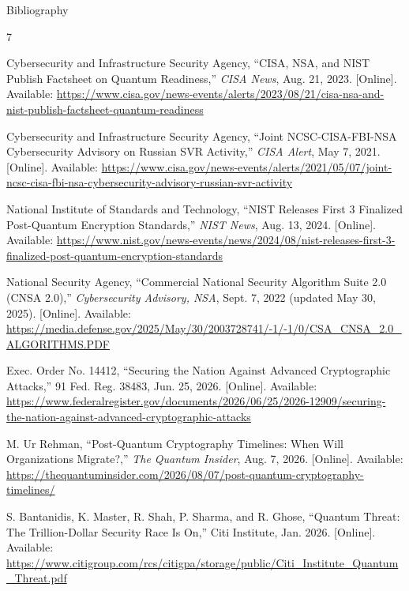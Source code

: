 \documentclass{article}
\begin{document}
\clearpage
{}
{}
 {Bibliography}
\begin{thebibliography}{7}

Cybersecurity and Infrastructure Security Agency, ``CISA, NSA, and NIST Publish Factsheet on Quantum Readiness,'' \textit{CISA News}, Aug. 21, 2023. [Online]. Available: \url{https://www.cisa.gov/news-events/alerts/2023/08/21/cisa-nsa-and-nist-publish-factsheet-quantum-readiness}

Cybersecurity and Infrastructure Security Agency, ``Joint NCSC-CISA-FBI-NSA Cybersecurity Advisory on Russian SVR Activity,'' \textit{CISA Alert}, May 7, 2021. [Online]. Available: \url{https://www.cisa.gov/news-events/alerts/2021/05/07/joint-ncsc-cisa-fbi-nsa-cybersecurity-advisory-russian-svr-activity}

National Institute of Standards and Technology, ``NIST Releases First 3 Finalized Post-Quantum Encryption Standards,'' \textit{ NIST News}, Aug. 13, 2024. [Online]. Available: \url{https://www.nist.gov/news-events/news/2024/08/nist-releases-first-3-finalized-post-quantum-encryption-standards}

National Security Agency, ``Commercial National Security Algorithm Suite 2.0 (CNSA 2.0),'' \textit{ Cybersecurity Advisory, NSA}, Sept. 7, 2022 (updated May 30, 2025). [Online]. Available: \url{https://media.defense.gov/2025/May/30/2003728741/-1/-1/0/CSA_CNSA_2.0_ALGORITHMS.PDF}


Exec. Order No. 14412, ``Securing the Nation Against Advanced Cryptographic Attacks,'' 91 Fed. Reg. 38483, Jun. 25, 2026. [Online]. Available: \url{https://www.federalregister.gov/documents/2026/06/25/2026-12909/securing-the-nation-against-advanced-cryptographic-attacks}

M. Ur Rehman, ``Post-Quantum Cryptography Timelines: When Will Organizations Migrate?,'' \textit{The Quantum Insider}, Aug. 7, 2026. [Online]. Available: \url{https://thequantuminsider.com/2026/08/07/post-quantum-cryptography-timelines/}

S. Bantanidis, K. Master, R. Shah, P. Sharma, and R. Ghose, ``Quantum Threat: The Trillion-Dollar Security Race Is On,'' Citi Institute, Jan. 2026. [Online]. Available: \url{https://www.citigroup.com/rcs/citigpa/storage/public/Citi_Institute_Quantum_Threat.pdf}

\end{thebibliography}
\end{document}
